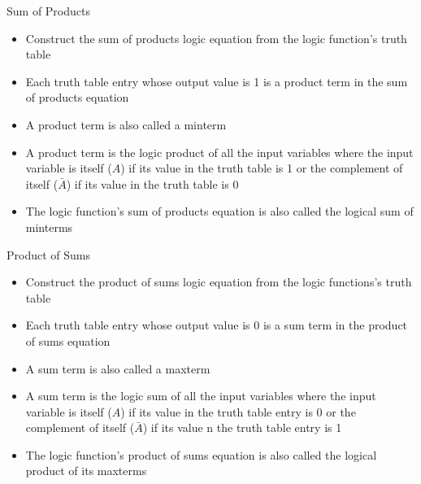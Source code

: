 \documentclass[12pt]{article}
\begin{document}
Sum of Products \begin{itemize} 
\item Construct the sum of products logic equation from the logic function's truth table 
\item Each truth table entry whose output value is 1 is a product term in the sum of products equation 
\item A product term is also called a minterm 
\item A product term is the logic product of all the input variables where the input variable is itself ($A$) if its value in the truth table is 1 or the complement of itself ($\bar{A}$) if its value in the truth table is 0 
\item The logic function's sum of products equation is also called the logical sum of minterms 
\end{itemize} 

Product of Sums \begin{itemize} 
\item Construct the product of sums logic equation from the logic functions's truth table 
\item Each truth table entry whose output value is 0 is a sum term in the product of sums equation 
\item A sum term is also called a maxterm 
\item A sum term is the logic sum of all the input variables where the input variable is itself ($A$) if its value in the truth table entry is 0 or the complement of itself ($\bar{A}$) if its value n the truth table entry is 1 
\item The logic function's product of sums equation is also called the logical product of its maxterms 
\end{itemize} 


\end{document}
